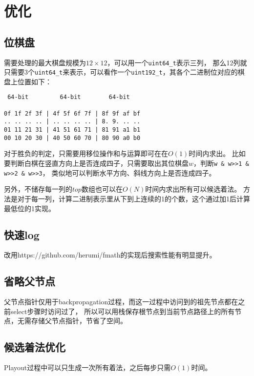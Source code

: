 \section{优化}

\subsection{位棋盘}

需要处理的最大棋盘规模为$12\times 12$，可以用一个\texttt{uint64\_t}表示三列，
那么12列就只需要3个\texttt{uint64\_t}来表示，可以看作一个\texttt{uint192\_t}，其各个二进制位对应的棋盘上位置如下：

\begin{verbatim}
 64-bit         64-bit        64-bit

0f 1f 2f 3f | 4f 5f 6f 7f | 8f 9f af bf
.. .. .. .. | .. .. .. .. | 8. 9. .. ..
01 11 21 31 | 41 51 61 71 | 81 91 a1 b1
00 10 20 30 | 40 50 60 70 | 80 90 a0 b0
\end{verbatim}

对于胜负的判定，只需要用移位操作和与运算即可在在$O(1)$时间内求出。
比如要判断白棋在竖直方向上是否连成四子，只需要取出其位棋盘$w$，判断\texttt{w \& w>>1 \& w>>2 \& w>>3}，
类似地可以判断水平方向、斜线方向上是否连成四子。

另外，不储存每一列的$top$数组也可以在$O(N)$时间内求出所有可以候选着法。
方法是对于每一列，计算二进制表示里从下到上连续的1的个数，这个通过加1后计算最低位的1实现。

\subsection{快速log}

改用https://github.com/herumi/fmath的实现后搜索性能有明显提升。

\subsection{省略父节点}

父节点指针仅用于backpropagation过程，而这一过程中访问到的祖先节点都在之前select步骤时访问过了，
所以可以用栈保存根节点到当前节点路径上的所有节点，无需存储父节点指针，节省了空间。

\subsection{候选着法优化}

Playout过程中可以只生成一次所有着法，之后每步只需$O(1)$时间。

